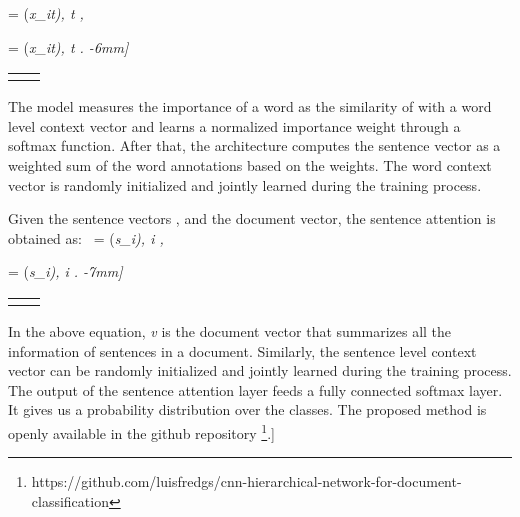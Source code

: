 \documentclass[runningheads]{llncs}
\begin{document}
       = (\it{x_{it}}), t \in [1,T],
    
     = (\it{x_{it}}), t \in [T,1].
-6mm]



\noindent
\begin{tabularx}{\linewidth}{@{}XX@{}}
    
    &
    
\end{tabularx}

\vspace{-5mm}



\vspace{-2mm}

The model measures the importance of a word as the similarity of  with a word level context vector  and learns a normalized importance weight  through a softmax function. After that, the architecture computes the sentence vector   as a weighted sum of the word annotations based on the weights. The word context vector  is randomly initialized and jointly learned during the training process.

Given the sentence vectors , and the document vector, the sentence attention is obtained as:\
       = (\it{s_{i}}), i \in [1,L],
    
       = (\it{s_{i}}), i \in [L,1].
    -7mm]



 
\noindent
\begin{tabularx}{\linewidth}{XX}
    
    &
    
    
\end{tabularx}

\vspace{-5mm}

 

\vspace{-1mm}

In the above equation, \textit{v} is the document vector that summarizes all the information of sentences in a document. Similarly, the sentence level context vector  can be randomly initialized and jointly learned during the training process. The output of the sentence attention layer feeds a fully connected softmax layer. It gives us a probability distribution over the classes. The proposed method is openly available in the github repository \footnote{https://github.com/luisfredgs/cnn-hierarchical-network-for-document-classification}.\-12mm]
\end{document}

